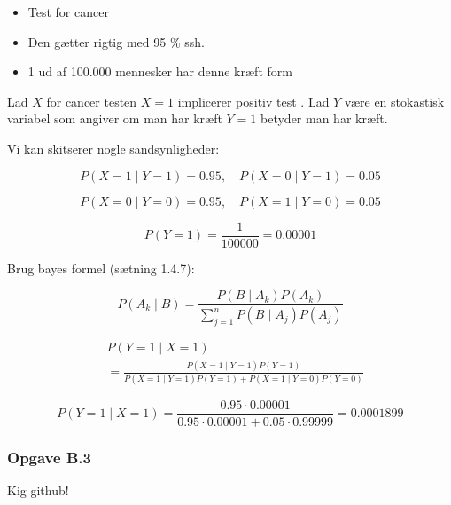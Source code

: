 \begin{itemize}
    \item Test for cancer
    \item Den gætter rigtig med 95 \% ssh.
    \item 1 ud af 100.000 mennesker har denne kræft form
\end{itemize}

Lad $X$ for cancer testen $X=1$ implicerer positiv test . Lad $Y$ være en stokastisk variabel som angiver om man har kræft $Y=1$ betyder man har kræft.

Vi kan skitserer nogle sandsynligheder:

\begin{equation}
    P(X=1 \mid Y=1)=0.95, \quad P(X=0 \mid Y=1)=0.05
\end{equation}

\begin{equation}
    P(X=0 \mid Y=0)=0.95, \quad P(X=1 \mid Y=0)=0.05
\end{equation}


\begin{equation}
    P(Y=1) = \frac{1}{100000} = 0.00001
\end{equation}

Brug bayes formel (sætning 1.4.7):

\begin{equation}
    P(A_k \mid B) = \frac{P(B \mid A_k)P(A_k)}{\sum_{j=1}^n P(B\mid A_j)P(A_j)}
\end{equation}


\begin{align}
    &P(Y=1 \mid X=1) \\ &= \frac{P(X=1\mid Y=1)P(Y=1)}{P(X=1 \mid Y=1)P(Y=1) + P(X=1 \mid Y=0)P(Y=0)} 
\end{align}

\begin{equation}
    P(Y=1 \mid X=1) = \frac{0.95 \cdot 0.00001}{0.95 \cdot 0.00001 + 0.05 \cdot 0.99999} = 0.0001899 
\end{equation}

\subsubsection{Opgave B.3}

Kig github!



